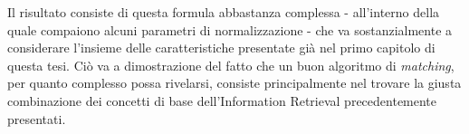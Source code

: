 Il risultato consiste di questa formula abbastanza complessa - all’interno della quale compaiono alcuni parametri di normalizzazione - che va sostanzialmente a considerare l’insieme delle caratteristiche presentate già nel primo capitolo di questa tesi. Ciò va a dimostrazione del fatto che un buon algoritmo di \textit{matching}, per quanto complesso possa rivelarsi, consiste principalmente nel trovare la giusta combinazione dei concetti di base dell’Information Retrieval precedentemente presentati.





















